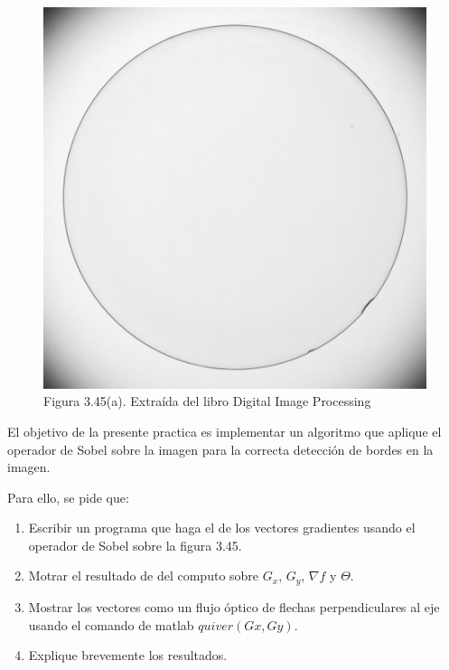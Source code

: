\documentclass[11pt, letterpaper]{article}
\begin{document}
\begin{figure}[h!]
	\centering
	\begin{minipage}{0.45\textwidth}
		\centering
		\includegraphics[width=\textwidth]{IMG/Fig3.45(a).jpg}
		\caption{Figura 3.45(a). Extraída del libro Digital Image Processing}
		\label{fig:f1}
	\end{minipage}\hfill
\end{figure}

El objetivo de la presente practica es implementar un algoritmo que aplique el operador de Sobel sobre la imagen para la correcta detección de bordes en la imagen.

Para ello, se pide que:

\begin{enumerate}
	\item Escribir un programa que haga el de los vectores gradientes usando el operador de Sobel sobre la figura 3.45.
	\item Motrar el resultado de del computo sobre $G_x$, $G_y$, $\nabla f$ y $\Theta$.
	\item  Mostrar los vectores como un flujo óptico de flechas perpendiculares al eje usando el comando de matlab $quiver(Gx,Gy)$.
	
	\item  Explique brevemente los resultados.
	
\end{enumerate}
	
\end{document}
